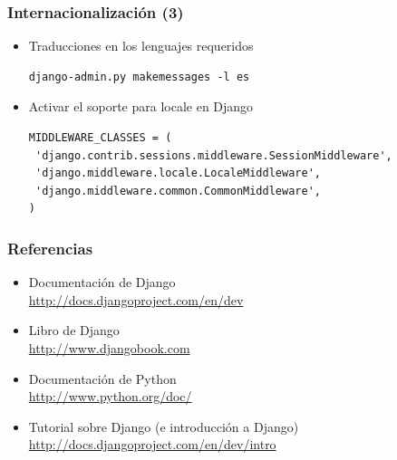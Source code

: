 
\begin{frame}[fragile]
\frametitle{Internacionalización (3)}

\begin{itemize}
\item Traducciones en los lenguajes requeridos

\begin{verbatim}
django-admin.py makemessages -l es
\end{verbatim}

\item Activar el soporte para locale en Django

\begin{verbatim}
MIDDLEWARE_CLASSES = (
 'django.contrib.sessions.middleware.SessionMiddleware',
 'django.middleware.locale.LocaleMiddleware',
 'django.middleware.common.CommonMiddleware',
)
\end{verbatim}

\end{itemize}

\end{frame}

\begin{frame}
\frametitle{Referencias}

\begin{itemize}
\item Documentación de Django \\
  \url{http://docs.djangoproject.com/en/dev}
\item Libro de Django \\
  \url{http://www.djangobook.com}
\item Documentación de Python \\
  \url{http://www.python.org/doc/}
\item Tutorial sobre Django (e introducción a Django) \\
\url{http://docs.djangoproject.com/en/dev/intro}
\end{itemize}

\end{frame}



